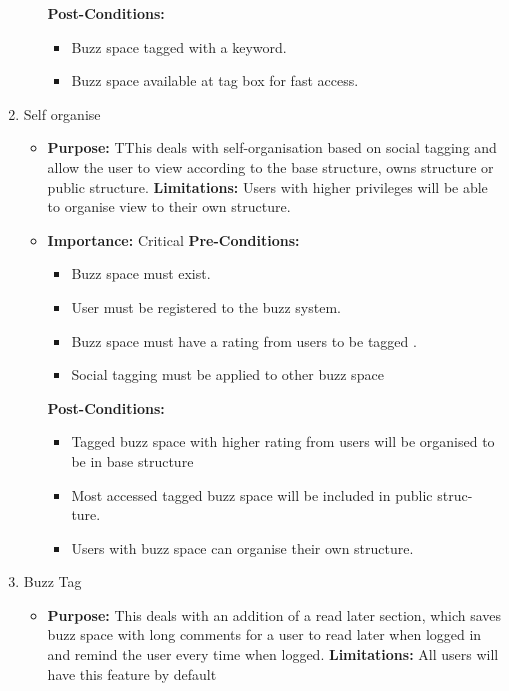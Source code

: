 \documentclass[11pt]{article}
\begin{document}
\begin{enumerate}
\begin{itemize}
\textbf{Post-Conditions: }
	\begin{itemize}
	\item Buzz space tagged with a keyword.
	\item Buzz space available at tag box for fast access.
	\end{itemize}
\end{itemize}

\item Self organise
\begin{itemize}
\item \textbf{Purpose:}
TThis deals with self-organisation based on social tagging and
allow the user to view according to the base structure, owns structure
or public structure.
\newline
\textbf{Limitations:} 
Users with higher privileges will be able to
organise view to their own structure.

\item \textbf{Importance:} Critical\newline
\textbf{Pre-Conditions: }
	\begin{itemize}
	\item Buzz space must exist.
	\item User must be registered to the buzz system.
	\item Buzz space must have a rating from users to be tagged .
	\item Social tagging must be applied to other buzz space
	\end{itemize}

\textbf{Post-Conditions: }
	\begin{itemize}
	\item Tagged buzz space with higher rating from users will be organised
to be in base structure
	\item Most accessed tagged buzz space will be included in public struc-
ture.
	\item Users with buzz space can organise their own structure.
	\end{itemize}
\end{itemize}

\item Buzz Tag
\begin{itemize}
\item \textbf{Purpose:}
This deals with an addition of a read later section, which saves
buzz space with long comments for a user to read later when logged
in and remind the user every time when logged.
\newline
\textbf{Limitations:} 
All users will have this feature by default


\end{itemize}
\end{enumerate}
\end{document}
